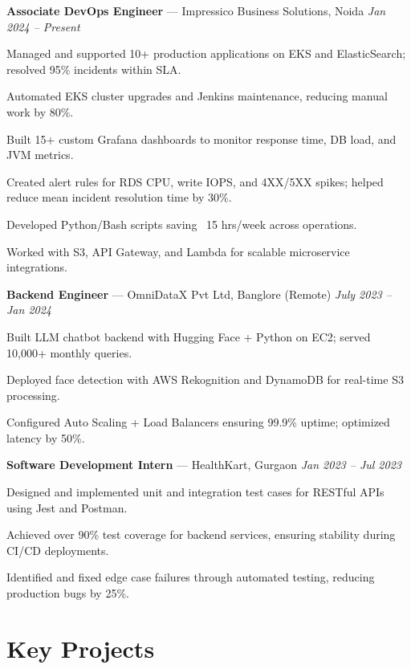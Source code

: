 \documentclass[letterpaper,10pt]{article}
\newcommand{\jobHeading}[3]{
  \noindent\textbf{#1} — #2 \hfill \textit{#3} \\
}
\newenvironment{resume_list}{
  \vspace{-6pt}
  \begin{itemize}[itemsep=2pt, leftmargin=18pt]
}{\end{itemize}}
\begin{document}
\jobHeading{Associate DevOps Engineer}{Impressico Business Solutions, Noida}{Jan 2024 – Present}
\begin{resume_list}
  \item Managed and supported 10+ production applications on EKS and ElasticSearch; resolved 95\% incidents within SLA.
  \item Automated EKS cluster upgrades and Jenkins maintenance, reducing manual work by 80\%.
   \item Built 15+ custom Grafana dashboards to monitor response time, DB load, and JVM metrics.
  \item Created alert rules for RDS CPU, write IOPS, and 4XX/5XX spikes; helped reduce mean incident resolution time by 30\%.
  \item Developed Python/Bash scripts saving ~15 hrs/week across operations.
  \item Worked with S3, API Gateway, and Lambda for scalable microservice integrations.
\end{resume_list}
\jobHeading{Backend Engineer}{OmniDataX Pvt Ltd, Banglore (Remote)}{July 2023 – Jan 2024}
\begin{resume_list}
  \item Built LLM chatbot backend with Hugging Face + Python on EC2; served 10,000+ monthly queries.
  \item Deployed face detection with AWS Rekognition and DynamoDB for real-time S3 processing.
  \item Configured Auto Scaling + Load Balancers ensuring 99.9\% uptime; optimized latency by 50\%.
\end{resume_list}

\jobHeading{Software Development Intern}{HealthKart, Gurgaon}{Jan 2023 – Jul 2023}
\begin{resume_list}
  \item Designed and implemented unit and integration test cases for RESTful APIs using Jest and Postman.
  \item Achieved over 90\% test coverage for backend services, ensuring stability during CI/CD deployments.
  \item Identified and fixed edge case failures through automated testing, reducing production bugs by 25\%.
\end{resume_list}


\section{Key Projects}
\end{document}
